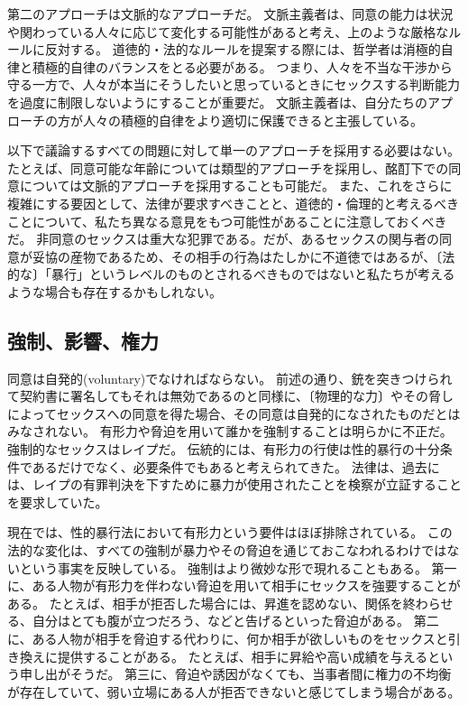 \documentclass[paper=a4,book,openany]{jlreq}
\begin{document}
第二のアプローチは文脈的なアプローチだ。
文脈主義者は、同意の能力は状況や関わっている人々に応じて変化する可能性があると考え、上のような厳格なルールに反対する。
道徳的・法的なルールを提案する際には、哲学者は消極的自律と積極的自律のバランスをとる必要がある。
つまり、人々を不当な干渉から守る一方で、人々が本当にそうしたいと思っているときにセックスする判断能力を過度に制限しないようにすることが重要だ。
文脈主義者は、自分たちのアプローチの方が人々の積極的自律をより適切に保護できると主張している。

以下で議論するすべての問題に対して単一のアプローチを採用する必要はない。
たとえば、同意可能な年齢については類型的アプローチを採用し、酩酊下での同意については文脈的アプローチを採用することも可能だ。
また、これをさらに複雑にする要因として、法律が要求すべきことと、道徳的・倫理的と考えるべきことについて、私たち異なる意見をもつ可能性があることに注意しておくべきだ。
非同意のセックスは重大な犯罪である。だが、あるセックスの関与者の同意が妥協の産物であるため、その相手の行為はたしかに不道徳ではあるが、〔法的な〕「暴行」というレベルのものとされるべきものではないと私たちが考えるような場合も存在するかもしれない。

\subsection{強制、影響、権力}

同意は自発的(voluntary)でなければならない。
前述の通り、銃を突きつけられて契約書に署名してもそれは無効であるのと同様に、〔物理的な力〕やその脅しによってセックスへの同意を得た場合、その同意は自発的になされたものだとはみなされない。
有形力や脅迫を用いて誰かを強制することは明らかに不正だ。
強制的なセックスはレイプだ。
伝統的には、有形力の行使は性的暴行の十分条件であるだけでなく、必要条件でもあると考えられてきた。
法律は、過去には、レイプの有罪判決を下すために暴力が使用されたことを検察が立証することを要求していた。

現在では、性的暴行法において有形力という要件はほぼ排除されている。
この法的な変化は、すべての強制が暴力やその脅迫を通じておこなわれるわけではないという事実を反映している。
強制はより微妙な形で現れることもある。
第一に、ある人物が有形力を伴わない脅迫を用いて相手にセックスを強要することがある。
たとえば、相手が拒否した場合には、昇進を認めない、関係を終わらせる、自分はとても腹が立つだろう、などと告げるといった脅迫がある。
第二に、ある人物が相手を脅迫する代わりに、何か相手が欲しいものをセックスと引き換えに提供することがある。
たとえば、相手に昇給や高い成績を与えるという申し出がそうだ。
第三に、脅迫や誘因がなくても、当事者間に権力の不均衡が存在していて、弱い立場にある人が拒否できないと感じてしまう場合がある。
\end{document}
